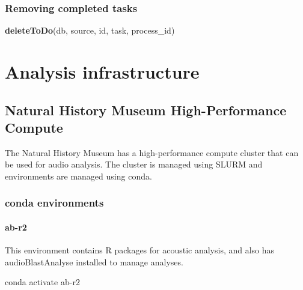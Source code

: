 \documentclass[
]{book}
\newenvironment{Shaded}{\begin{snugshade}}{\end{snugshade}}
\newcommand{\ExtensionTok}[1]{#1}
\newcommand{\FunctionTok}[1]{\textcolor[rgb]{0.13,0.29,0.53}{\textbf{#1}}}
\newcommand{\NormalTok}[1]{#1}
\begin{document}
\hypertarget{removing-completed-tasks}{%
\subsection{Removing completed tasks}\label{removing-completed-tasks}}

\begin{Shaded}
\begin{Highlighting}[]
\FunctionTok{deleteToDo}\NormalTok{(db, source, id, task, process\_id)}
\end{Highlighting}
\end{Shaded}

\hypertarget{analysis-infrastructure}{%
\chapter{Analysis infrastructure}\label{analysis-infrastructure}}

\hypertarget{natural-history-museum-high-performance-compute}{%
\section{Natural History Museum High-Performance Compute}\label{natural-history-museum-high-performance-compute}}

The Natural History Museum has a high-performance compute cluster that can be used for audio analysis. The cluster is managed using SLURM and environments are managed using conda.

\hypertarget{conda-environments}{%
\subsection{conda environments}\label{conda-environments}}

\hypertarget{ab-r2}{%
\subsubsection{ab-r2}\label{ab-r2}}

This environment contains R packages for acoustic analysis, and also has audioBlastAnalyse installed to manage analyses.

\begin{Shaded}
\begin{Highlighting}[]
\ExtensionTok{conda}\NormalTok{ activate ab{-}r2}
\end{Highlighting}
\end{Shaded}
\end{document}
